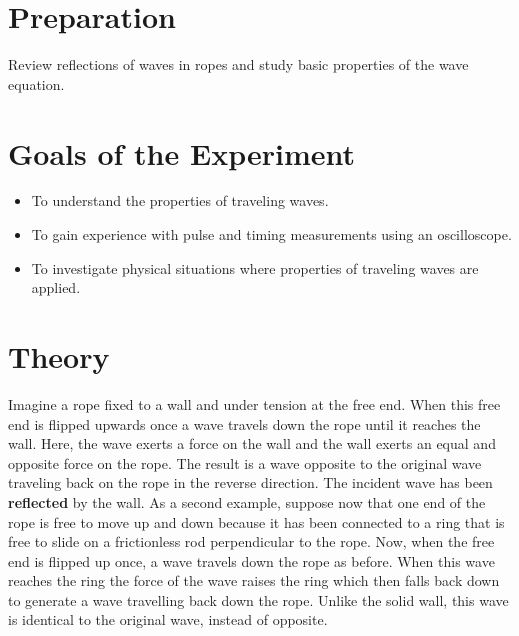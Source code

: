 \section{Preparation}
Review reflections of waves in ropes and study basic properties of the wave equation.

\section{Goals of the Experiment}
\begin{itemize}
    \item To understand the properties of traveling waves.
    \item To gain experience with pulse and timing measurements using an oscilloscope.
    \item To investigate physical situations where properties of traveling waves are applied.
\end{itemize}

\section{Theory}
Imagine a rope fixed to a wall and under tension at the free end. When this free end is flipped upwards once a wave travels down the rope until it reaches the wall. Here, the wave exerts a force on the wall and the wall exerts an equal and opposite force on the rope. The result is a wave opposite to the original wave traveling back on the rope in the reverse direction. The incident wave has been {\bf reflected} by the wall. As a second example, suppose now that one end of the rope is free to move up and down because it has been connected to a ring that is free to slide on a frictionless rod perpendicular to the rope. Now, when the free end is flipped up once, a wave travels down the rope as before. When this wave reaches the ring the force of the wave raises the ring which then falls back down to generate a wave travelling back down the rope. Unlike the solid wall, this wave is identical to the original wave, instead of opposite.

